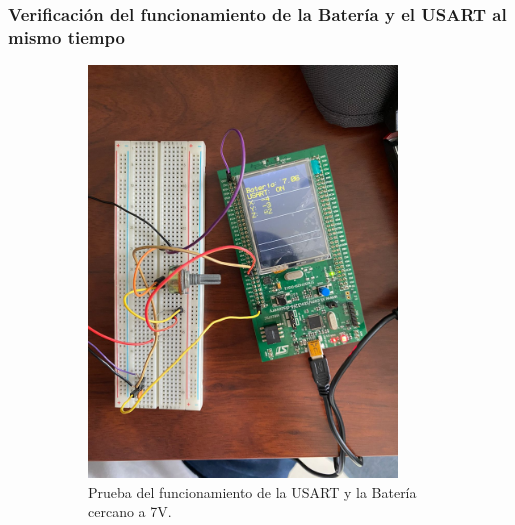 \subsubsection{Verificación del funcionamiento de la Batería y el USART al mismo tiempo}

\begin{figure}[H]
    \begin{subfigure}{0.5\textwidth}
    \centering
    \includegraphics[width=0.9\textwidth]{Imagenes/Prueba_Bat_USART.jpg} 
    \caption{Prueba del funcionamiento de la USART y la Batería cercano a 7V.}
    \label{Fig:Prueba_Bat_USART}
\end{subfigure}
\begin{subfigure}{0.5\textwidth}
    \centering

\end{subfigure}
\end{figure}
